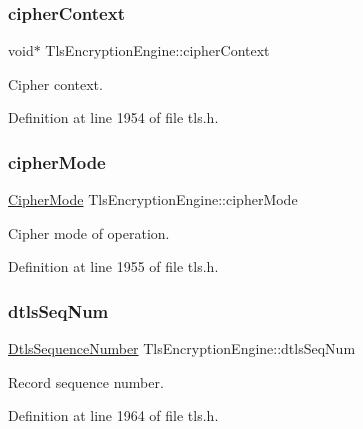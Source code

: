\subsubsection{\texorpdfstring{cipher\+Context}{cipherContext}}
{\footnotesize\ttfamily void$\ast$ Tls\+Encryption\+Engine\+::cipher\+Context}



Cipher context. 



Definition at line 1954 of file tls.\+h.

\mbox{\label{structTlsEncryptionEngine_ac7326a9b894b4447ed52df0baa65b294}} 
\subsubsection{\texorpdfstring{cipher\+Mode}{cipherMode}}
{\footnotesize\ttfamily \hyperlink{cyclone__crypto_2core_2crypto_8h_ac3adaabf9bad553901589ddf3de6daf5}{Cipher\+Mode} Tls\+Encryption\+Engine\+::cipher\+Mode}



Cipher mode of operation. 



Definition at line 1955 of file tls.\+h.

\mbox{\label{structTlsEncryptionEngine_a5b11eabf56e10b96ec3c1879a422b1fe}} 
\subsubsection{\texorpdfstring{dtls\+Seq\+Num}{dtlsSeqNum}}
{\footnotesize\ttfamily \hyperlink{dtls__misc_8h_a900105a81f878731b46d80a2cde979aa}{Dtls\+Sequence\+Number} Tls\+Encryption\+Engine\+::dtls\+Seq\+Num}



Record sequence number. 



Definition at line 1964 of file tls.\+h.

\mbox{\label{structTlsEncryptionEngine_ac52797db6bbb0e89321c969292dfddd6}} 
